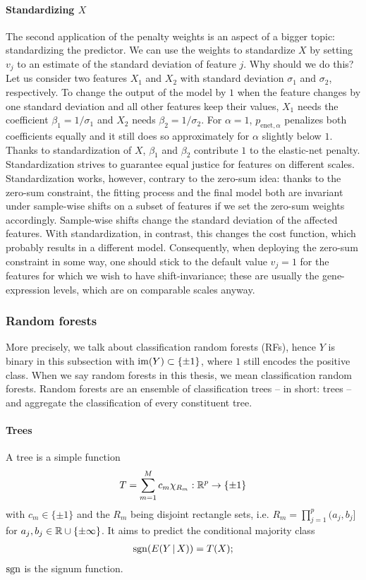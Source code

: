 \paragraph{Standardizing $X$} 
The second application of the penalty weights is an aspect of a bigger topic: standardizing the
predictor. We can use the weights to standardize $X$ by setting $v_j$ to an estimate of the standard 
deviation of feature $j$. Why 
should we do this? Let us consider two features $X_1$ and $X_2$ with standard deviation $\sigma_1$
and $\sigma_2$, respectively. To change the output of the model by $1$ when the feature changes by 
one standard deviation and all other features keep their values, $X_1$ needs the coefficient 
$\beta_1 = 1/\sigma_1$ and $X_2$ needs $\beta_2 = 1/\sigma_2$. For $\alpha = 1$, 
$p_{\text{enet}, \alpha}$ penalizes both coefficients equally and it still does so approximately 
for $\alpha$ slightly below $1$. Thanks to standardization of $X$, $\beta_1$ and $\beta_2$ contribute 
$1$ to the elastic-net penalty. Standardization strives to guarantee equal justice for features 
on different scales. Standardization works, however, contrary to the zero-sum idea: thanks to the 
zero-sum constraint, the fitting process and the final model both are invariant under sample-wise 
shifts on a subset of features if we set the zero-sum weights accordingly. Sample-wise shifts 
change the standard deviation of the affected features. With standardization, in 
contrast, this changes the cost function, which probably results in a different model. 
Consequently, when deploying the zero-sum constraint in some way, one should stick to the default 
value $v_j = 1$ for the features for which we wish to have shift-invariance; these are usually the 
gene-expression levels, which are on comparable scales anyway.

\subsubsection{Random forests}

More precisely, we talk about classification random forests (RFs), hence $Y$ is binary in this subsection 
with $\mathrm{im}(Y) \subset \{ \pm 1 \}$, where $1$ still encodes the positive class. When we say random 
forests in this thesis, we mean classification 
random forests. Random forests are an ensemble of classification trees -- in short: 
trees -- and aggregate the classification of every constituent tree.

\paragraph{Trees}
A tree is a simple function
\begin{align}
    T = \sum_{m=1}^M c_m \chi_{R_m}: \mathbb{R}^p \to \{ \pm 1 \}
\end{align}
with $c_m \in \{\pm 1\}$ and the $R_m$ being disjoint rectangle sets, i.e. $R_m = \prod_{j=1}^p 
(a_j, b_j]$ for $a_j, b_j \in \mathbb{R} \cup \{ \pm \infty \}$. It aims to predict the conditional 
majority class 
\begin{align}\label{eq:rf-major}
    \mathrm{sgn}(E(Y \,|\, X)) = T(X);
\end{align}
$\mathrm{sgn}$ is the signum function.


